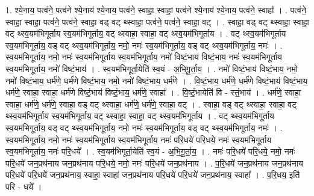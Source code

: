 \documentclass[17pt]{extarticle}
\begin{document}
1. श्ये॒नाय॒ पत्व॑ने॒ पत्व॑ने श्ये॒नाय॑ श्ये॒नाय॒ पत्व॑ने॒ स्वाहा॒ स्वाहा॒ पत्व॑ने श्ये॒नाय॑ श्ये॒नाय॒ पत्व॑ने॒ स्वाहा᳚ । . पत्व॑ने॒ स्वाहा॒ स्वाहा॒ पत्व॑ने॒ पत्व॑ने॒ स्वाहा॒ वड् वट् थ्स्वाहा॒ पत्व॑ने॒ पत्व॑ने॒ स्वाहा॒ वट् । . स्वाहा॒ वड् वट् थ्स्वाहा॒ स्वाहा॒ वट् थ्स्व॒यम॑भिगूर्ताय स्व॒यम॑भिगूर्ताय॒ वट् थ्स्वाहा॒ स्वाहा॒ 
वट् थ्स्व॒यम॑भिगूर्ताय । . वट् थ्स्व॒यम॑भिगूर्ताय स्व॒यम॑भिगूर्ताय॒ वड् वट् थ्स्व॒यम॑भिगूर्ताय॒ नमो॒ नमः॑ स्व॒यम॑भिगूर्ताय॒ वड् वट् थ्स्व॒यम॑भिगूर्ताय॒ नमः॑ । . स्व॒यम॑भिगूर्ताय॒ नमो॒ नमः॑ स्व॒यम॑भिगूर्ताय स्व॒यम॑भिगूर्ताय॒ नमो॑ विष्टं॒भाय॑ विष्टं॒भाय॒ नमः॑ स्व॒यम॑भिगूर्ताय स्व॒यम॑भिगूर्ताय॒ नमो॑ विष्टं॒भाय॑ । . स्व॒यम॑भिगूर्ता॒येति॑ स्व॒यं - अ॒भि॒गू॒र्ता॒य॒ । . नमो॑ विष्टं॒भाय॑ विष्टं॒भाय॒ नमो॒ नमो॑ विष्टं॒भाय॒ धर्म॑णे॒ धर्म॑णे विष्टं॒भाय॒ नमो॒ नमो॑ विष्टं॒भाय॒ धर्म॑णे । . वि॒ष्टं॒भाय॒ धर्म॑णे॒ धर्म॑णे विष्टं॒भाय॑ विष्टं॒भाय॒ धर्म॑णे॒ स्वाहा॒ स्वाहा॒ धर्म॑णे विष्टं॒भाय॑ विष्टं॒भाय॒ धर्म॑णे॒ स्वाहा᳚ । . वि॒ष्टं॒भायेति॑ वि - स्तं॒भाय॑ । . धर्म॑णे॒ स्वाहा॒ स्वाहा॒ धर्म॑णे॒ धर्म॑णे॒ स्वाहा॒ वड् वट् थ्स्वाहा॒ धर्म॑णे॒ धर्म॑णे॒ स्वाहा॒ वट् । . स्वाहा॒ वड् वट् थ्स्वाहा॒ स्वाहा॒ वट् थ्स्व॒यम॑भिगूर्ताय स्व॒यम॑भिगूर्ताय॒ वट् थ्स्वाहा॒ स्वाहा॒ वट् थ्स्व॒यम॑भिगूर्ताय । . वट् थ्स्व॒यम॑भिगूर्ताय स्व॒यम॑भिगूर्ताय॒ वड् वट् थ्स्व॒यम॑भिगूर्ताय॒ नमो॒ नमः॑ स्व॒यम॑भिगूर्ताय॒ वड् वट् थ्स्व॒यम॑भिगूर्ताय॒ नमः॑ । . स्व॒यम॑भिगूर्ताय॒ नमो॒ नमः॑ स्व॒यम॑भिगूर्ताय स्व॒यम॑भिगूर्ताय॒ नमः॑ परि॒धये॑ परि॒धये॒ नमः॑ स्व॒यम॑भिगूर्ताय स्व॒यम॑भिगूर्ताय॒ नमः॑ परि॒धये᳚ । . स्व॒यम॑भिगूर्ता॒येति॑ स्व॒यं - अ॒भि॒गू॒र्ता॒य॒ । . नमः॑ परि॒धये॑ परि॒धये॒ नमो॒ नमः॑ परि॒धये॑ जन॒प्रथ॑नाय जन॒प्रथ॑नाय परि॒धये॒ नमो॒ नमः॑ परि॒धये॑ जन॒प्रथ॑नाय । . प॒रि॒धये॑ जन॒प्रथ॑नाय जन॒प्रथ॑नाय परि॒धये॑ परि॒धये॑ जन॒प्रथ॑नाय॒ स्वाहा॒ स्वाहा॑ जन॒प्रथ॑नाय परि॒धये॑ परि॒धये॑ जन॒प्रथ॑नाय॒ स्वाहा᳚ । . प॒रि॒धय॒ इति॑ परि - धये᳚ । \newline
\end{document}
